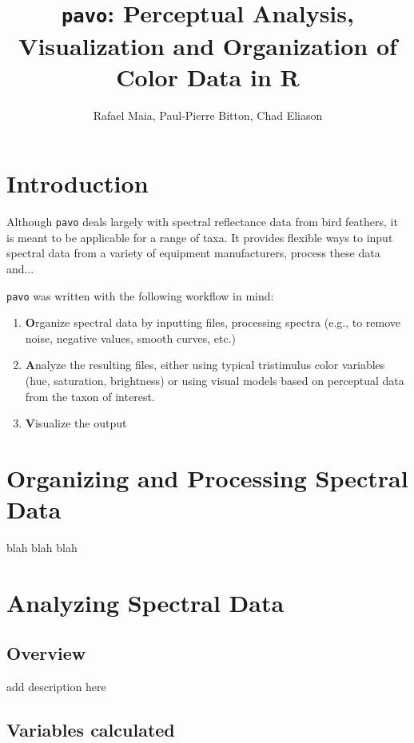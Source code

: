\documentclass{article}
\newcommand{\pavo}{{\tt pavo}}  %
\begin{document}



\title{\pavo{}: {\bf P}erceptual {\bf A}nalysis, {\bf V}isualization and {\bf O}rganization of Color Data in R}
\author{Rafael Maia, Paul-Pierre Bitton, Chad Eliason}

\maketitle

\section*{Introduction}

Although \pavo{} deals largely with spectral reflectance data from bird feathers, it is meant to be applicable for a range of taxa. It provides flexible ways to input spectral data from a variety of equipment manufacturers, process these data and...

\pavo{} was written with the following workflow in mind:

\begin{enumerate}
\item {\bf O}rganize spectral data by inputting files, processing spectra (e.g., to remove noise, negative values, smooth curves, etc.)
\item {\bf A}nalyze the resulting files, either using typical tristimulus color variables (hue, saturation, brightness) or using visual models based on perceptual data from the taxon of interest.
\item {\bf V}isualize the output
\end{enumerate}


\section{Organizing and Processing Spectral Data}

blah blah blah


\section{Analyzing Spectral Data}

\subsection{Overview}

add description here

\subsection{Variables calculated}
\end{document}
